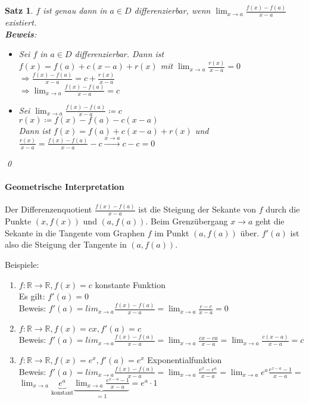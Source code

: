 \documentclass[ngerman,titlepage,twoside, parskip=half*]{scrreprt}
\newcommand*{\R}{\mathbb{R}}
\theoremstyle{break}
\newtheorem{theorem}{Satz}[section]
\theoremstyle{nonumberbreak}
\begin{document}
\begin{theorem}
$f$ ist genau dann in $a\in D$ differenzierbar, wenn $\lim_{x\rightarrow a} \frac{f(x)-f(a)}{x-a}$
existiert.\\
\textbf{Beweis}:
\begin{itemize}
  \item["`$\Rightarrow$"'] Sei $f$ in $a\in D$ differenzierbar. Dann ist $f(x)=f(a)+c(x-a)+r(x)$ mit
    $\lim_{x\rightarrow a}\frac{r(x)}{x-a}=0$\\
    $\Rightarrow \frac{f(x)-f(a)}{x-a}=c+\frac{r(x)}{x-a}$\\
    $\Rightarrow \lim_{x\rightarrow a} \frac{f(x)-f(a)}{x-a}=c$
  \item["`$\Leftarrow$"'] Sei $\lim_{x\rightarrow a}
  \frac{f(x)-f(a)}{x-a}\coloneqq c$\\
    $r(x)\coloneqq f(x)-f(a)-c(x-a)$\\
    Dann ist $f(x)=f(a)+c(x-a)+r(x)$ und $\frac{r(x)}{x-a}=
    \frac{f(x)-f(a)}{x-a}-c\stackrel{x\rightarrow a}{\rightarrow}c-c=0$
\end{itemize}
\qed
\end{theorem}

\paragraph{Geometrische Interpretation}
Der Differenzenquotient
$\frac{f(x)-f(a)}{x-a}$ ist die Steigung der Sekante
 von $f$ durch die Punkte $(x,f(x))$ und
$(a,f(a))$. Beim Grenzübergang $x\rightarrow a$ geht die Sekante in
die Tangente vom Graphen $f$ im Punkt $(a,f(a))$
über. $f'(a)$ ist also die Steigung der Tangente in $(a,f(a))$.

Beispiele:
\begin{enumerate}[(1)]
\item $f\colon\R\rightarrow\R, f(x)=c$ konstante Funktion\\
  Es gilt: $f'(a)=0$\\
  Beweis: $f'(a)=lim_{x\rightarrow
    a}\frac{f(x)-f(a)}{x-a}=\lim_{x\rightarrow a}\frac{c-c}{x-a}=0$
\item $f\colon\R\rightarrow\R, f(x)=cx, f'(a)=c$\\
  Beweis: $f'(a)=lim_{x\rightarrow
    a}\frac{f(x)-f(a)}{x-a}=\lim_{x\rightarrow a}\frac{cx-ca}{x-a}
  =\lim_{x\rightarrow a}\frac{c(x-a)}{x-a}=c$
\item $f\colon\R\rightarrow\R, f(x)=e^x, f'(a)=e^x$ Exponentialfunktion\\
  Beweis: $f'(a)=lim_{x\rightarrow
    a}\frac{f(x)-f(a)}{x-a}=\lim_{x\rightarrow a}\frac{e^x-e^a}{x-a}=
  \lim_{x\rightarrow a}e^a\frac{e^{x-a}-1}{x-a}=$\\
  $\lim_{x\rightarrow a}\underbrace{e^a}_{\text{konstant}}
  \underbrace{\lim_{x\rightarrow
      a}\frac{e^{x-a}-1}{x-a}}_{=1}=e^a\cdot 1$
 \end{enumerate}
\end{document}
